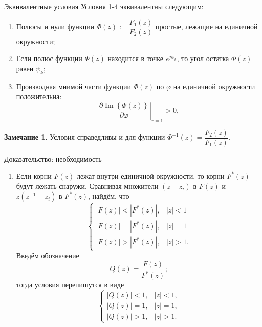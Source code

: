 \documentclass[notheorems,aspectratio=169]{beamer}
\theoremstyle{definition}
\newtheorem{remark}{Замечание}
\newcommand{\abs}[1]{\left| #1 \right|}
\renewcommand{\Im}{\operatorname{Im}}
\begin{document}
\begin{frame}{Эквивалентные условия}
  Условия 1-4 эквивалентны следующим:
  \begin{enumerate}
  \item Полюсы и нули функции $\Phi(z) := \dfrac{F_1(z)}{F_2(z)}$ простые, лежащие на единичной окружности;
  \item Если полюс функции $\Phi(z)$ находится в точке $e^{j\psi_k}$, то угол остатка $\Phi(z)$ равен $\psi_k$;
  \item Производная мнимой части функции $\Phi(z)$ по $\varphi$ на единичной окружности положительна:
    \begin{equation*}
      \left. \frac{\partial \Im\left\{ \Phi(z) \right\}}{\partial \varphi} \right|_{r=1} > 0,
    \end{equation*}
  \end{enumerate}

  \begin{remark}
    Условия справедливы и для функции $\Phi^{-1}(z) = \dfrac{F_2(z)}{F_1(z)}$.
  \end{remark}
\end{frame}

\begin{frame}{Доказательство: необходимость}
  \begin{enumerate}
  \item Если корни $F(z)$ лежат внутри единичной окружности, то корни $F^*(z)$ будут лежать снаружи. Сравнивая множители
    $(z - z_i)$ в $F(z)$ и $z(z^{-1} - z_i)$ в $F^*(z)$, найдём, что
    \begin{equation}\label{eq:relations_1}
      \begin{cases}
        \abs{F(z)} < \abs{F^*(z)}, & \abs{z} < 1 \\
        \abs{F(z)} = \abs{F^*(z)}, & \abs{z} = 1 \\
        \abs{F(z)} > \abs{F^*(z)}, & \abs{z} > 1.
      \end{cases}
    \end{equation}
    Введём обозначение
    \begin{equation*}
      Q(z) = \frac{F(z)}{F^*(z)};
    \end{equation*}
    тогда условия перепишутся в виде
    \begin{equation}\label{eq:relations_2}
      \begin{cases}
        \abs{Q(z)} < 1, & \abs{z} < 1, \\
        \abs{Q(z)} = 1, & \abs{z} = 1, \\
        \abs{Q(z)} > 1, & \abs{z} > 1.
      \end{cases}
    \end{equation}
  \end{enumerate}
\end{frame}
\end{document}
